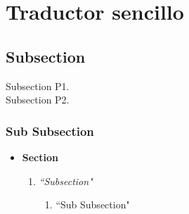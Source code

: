 \documentclass[a4paper]{memoir}
\begin{document}
    \section*{Traductor sencillo}
    \subsection*{Subsection}

    Subsection P1.\\

    Subsection P2.

    \subsubsection*{Sub Subsection}

    \begin{itemize}
        \item \textbf{Section}
        \begin{enumerate}
            \item \emph{``Subsection"}
            \begin{enumerate}
                \item ``Sub Subsection"
            \end{enumerate}
        \end{enumerate}
    \end{itemize}

    
    
\end{document}
